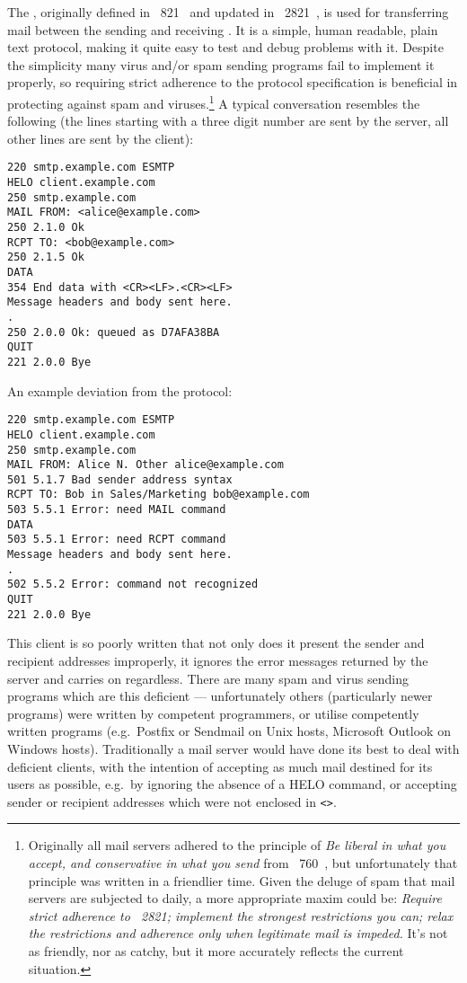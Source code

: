 The \SMTPlong{}, originally defined in \RFC{}~821~\cite{RFC821} and updated
in \RFC{}~2821~\cite{RFC2821}, is used for transferring mail between the
sending and receiving \MTA{}\@.  It is a simple, human readable, plain text
protocol, making it quite easy to test and debug problems with it.  Despite
the simplicity many virus and/or spam sending programs fail to implement it
properly, so requiring strict adherence to the protocol specification is
beneficial in protecting against spam and
viruses.\footnote{\label{footnote:rfc760}Originally all mail servers
adhered to the principle of \textit{Be liberal in what you accept, and
conservative in what you send\/} from \RFC{}~760~\cite{rfc760}, but
unfortunately that principle was written in a friendlier time.  Given the
deluge of spam that mail servers are subjected to daily, a more appropriate
maxim could be: \textit{Require strict adherence to \RFC{}~2821; implement
the strongest restrictions you can; relax the restrictions and adherence
only when legitimate mail is impeded.\/}  It's not as friendly, nor as
catchy, but it more accurately reflects the current situation.} A typical
\SMTP{} conversation resembles the following (the lines starting with a
three digit number are sent by the server, all other lines are sent by the
client):

\begin{verbatim}
220 smtp.example.com ESMTP
HELO client.example.com
250 smtp.example.com
MAIL FROM: <alice@example.com>
250 2.1.0 Ok
RCPT TO: <bob@example.com>
250 2.1.5 Ok
DATA
354 End data with <CR><LF>.<CR><LF>
Message headers and body sent here.
.
250 2.0.0 Ok: queued as D7AFA38BA
QUIT
221 2.0.0 Bye
\end{verbatim}

An example deviation from the protocol:

\begin{verbatim}
220 smtp.example.com ESMTP
HELO client.example.com
250 smtp.example.com
MAIL FROM: Alice N. Other alice@example.com
501 5.1.7 Bad sender address syntax
RCPT TO: Bob in Sales/Marketing bob@example.com
503 5.5.1 Error: need MAIL command
DATA
503 5.5.1 Error: need RCPT command
Message headers and body sent here.
.
502 5.5.2 Error: command not recognized
QUIT
221 2.0.0 Bye
\end{verbatim}

This client is so poorly written that not only does it present the sender
and recipient addresses improperly, it ignores the error messages returned
by the server and carries on regardless.  There are many spam and virus
sending programs which are this deficient --- unfortunately others
(particularly newer programs) were written by competent programmers, or
utilise competently written programs (e.g.\ Postfix or Sendmail on Unix
hosts, Microsoft Outlook on Windows hosts).  Traditionally a mail server
would have done its best to deal with deficient clients, with the intention
of accepting as much mail destined for its users as
possible, e.g.\ by ignoring the absence of a HELO
command, or accepting sender or recipient addresses which were not enclosed
in \texttt{<>}.  

